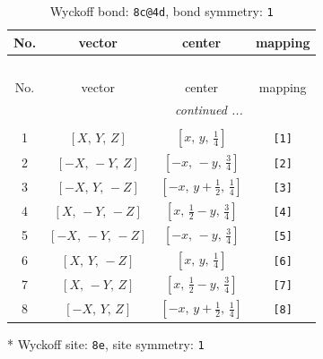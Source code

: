 \documentclass[fleqn,8pt]{jsarticle}
\begin{document}
\renewcommand{\arraystretch}{1.2}
\begin{longtable}{cccc}
\caption{Wyckoff bond: {\tt 8c@4d}, bond symmetry: {\tt 1}}
 \\
 \hline \hline
No. & vector & center & mapping \\ \hline \endfirsthead

\multicolumn{3}{l}{\tablename\ \thetable{}} \\
 \hline \hline
No. & vector & center & mapping \\ \hline \endhead

 \hline \hline
\multicolumn{3}{r}{\footnotesize\it continued ...} \\ \endfoot

 \hline \hline
\multicolumn{3}{r}{} \\ \endlastfoot

1 & $\left[ X,\, Y,\, Z \right]$ & $\left[ x,\, y,\, \frac{1}{4} \right]$ & {\tt [1]} \\ \hline
2 & $\left[ - X,\, - Y,\, Z \right]$ & $\left[ - x,\, - y,\, \frac{3}{4} \right]$ & {\tt [2]} \\ \hline
3 & $\left[ - X,\, Y,\, - Z \right]$ & $\left[ - x,\, y + \frac{1}{2},\, \frac{1}{4} \right]$ & {\tt [3]} \\ \hline
4 & $\left[ X,\, - Y,\, - Z \right]$ & $\left[ x,\, \frac{1}{2} - y,\, \frac{3}{4} \right]$ & {\tt [4]} \\ \hline
5 & $\left[ - X,\, - Y,\, - Z \right]$ & $\left[ - x,\, - y,\, \frac{3}{4} \right]$ & {\tt [5]} \\ \hline
6 & $\left[ X,\, Y,\, - Z \right]$ & $\left[ x,\, y,\, \frac{1}{4} \right]$ & {\tt [6]} \\ \hline
7 & $\left[ X,\, - Y,\, Z \right]$ & $\left[ x,\, \frac{1}{2} - y,\, \frac{3}{4} \right]$ & {\tt [7]} \\ \hline
8 & $\left[ - X,\, Y,\, Z \right]$ & $\left[ - x,\, y + \frac{1}{2},\, \frac{1}{4} \right]$ & {\tt [8]} \\
\end{longtable}
* Wyckoff site: {\tt 8e}, site symmetry: {\tt 1}
\renewcommand{\arraystretch}{1.2}
\end{document}
